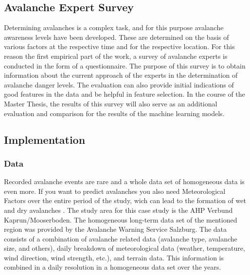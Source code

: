\documentclass[12pt,a4paper]{article}
\begin{document}
\subsection{Avalanche Expert Survey}
Determining avalanches is a complex task, and for this purpose avalanche awareness levels have been developed. These are determined on the basis of various factors at the respective time and for the respective location. For this reason the first empirical part of the work, a survey of avalanche experts is conducted in the form of a questionnaire. 
The purpose of this survey is to obtain information about the current approach of the experts in the determination of avalanche danger levels. The evaluation can also provide initial indications of good features in the data and be helpful in feature selection. In the course of the Master Thesis, the results of this survey will also serve as an additional evaluation and comparison for the results of the machine learning models.





\subsection{Implementation}
\subsubsection{Data}
 Recorded avalanche events are rare and a whole data set of homogeneous data is even more. If you want to predict avalanches you also need Meteorological Factors over the entire period of the study, wich can lead to the formation of wet and dry avalanches \autocites{Harvey:2016}.
The study area for this case study is the AHP Verbund Kaprun/Mooserboden. The homogeneous long-term data set of the mentioned region was provided by the Avalanche Warning Service Salzburg.
The data consists of a combination of avalanche related data (avalanche type, avalanche size, and others), daily breakdown of meteorological data (weather, temperature, wind direction, wind strength, etc.), and terrain data. This information is combined in a daily resolution in a homogeneous data set over the years.
\end{document}

